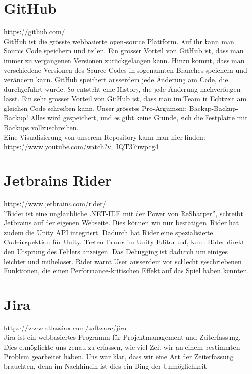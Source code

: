 \section{GitHub}
\url{https://github.com/}\\
GitHub ist die grösste webbasierte open-source Plattform. Auf ihr kann man Source Code speichern und teilen. Ein grosser Vorteil von GitHub ist, dass man immer zu vergangenen Versionen zurückgelangen kann.
Hinzu kommt, dass man verschiedene Versionen des Source Codes in sogenannten Branches speichern und verändern kann. GitHub speichert ausserdem jede Änderung am Code, die durchgeführt wurde. So entsteht eine History, die jede Änderung nachverfolgen lässt. 
Ein sehr grosser Vorteil von GitHub ist, dass man im Team in Echtzeit am gleichen Code schreiben kann. Unser grösstes Pro-Argument: Backup-Backup-Backup!
Alles wird gespeichert, und es gibt keine Gründe, sich die Festplatte mit Backups vollzuschreiben. \\
Eine Visualisierung von unserem Repository kann man hier finden: \url{https://www.youtube.com/watch?v=IQT37uwpcg4}


\section{Jetbrains Rider}
\url{https://www.jetbrains.com/rider/}\\
''Rider ist eine unglaubliche .NET-IDE mit der Power von ReSharper'', schreibt Jetbrains auf der eigenen Webseite. Dies können wir nur bestätigen. Rider hat zudem die Unity API integriert. Dadurch hat Rider eine
spezialisierte Codeinspektion für Unity. Treten Errors im Unity Editor auf, kann Rider direkt den Ursprung des Fehlers anzeigen. Das Debugging ist dadurch um einiges leichter und müheloser. 
Rider warnt User ausserdem vor schlecht geschriebenen Funktionen, die einen Performance-kritischen Effekt auf das Spiel haben könnten. 


\section{Jira}
\url{https://www.atlassian.com/software/jira}\\
Jira ist ein webbasiertes Programm für Projektmanagement und Zeiterfassung. Dies ermöglichte uns genau zu erfassen, wie viel Zeit wir an einem bestimmten Problem gearbeitet haben. Uns war klar, dass wir eine Art 
der Zeiterfassung brauchten, denn im Nachhinein ist dies ein Ding der Unmöglichkeit.

